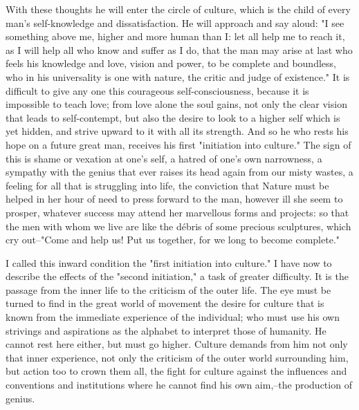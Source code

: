 With these thoughts he will enter the circle of culture, which is the
child of every man's self-knowledge and dissatisfaction. He will
approach and say aloud: "I see something above me, higher and more
human than I: let all help me to reach it, as I will help all who
know and suffer as I do, that the man may arise at last who feels his
knowledge and love, vision and power, to be complete and boundless,
who in his universality is one with nature, the critic and judge of
existence." It is difficult to give any one this courageous
self-consciousness, because it is impossible to teach love; from love
alone the soul gains, not only the clear vision that leads to
self-contempt, but also the desire to look to a higher self which is
yet hidden, and strive upward to it with all its strength. And so he
who rests his hope on a future great man, receives his first
"initiation into culture." The sign of this is shame or vexation at
one's self, a hatred of one's own narrowness, a sympathy with the
genius that ever raises its head again from our misty wastes, a
feeling for all that is struggling into life, the conviction that
Nature must be helped in her hour of need to press forward to the
man, however ill she seem to prosper, whatever success may attend her
marvellous forms and projects: so that the men with whom we live are
like the débris of some precious sculptures, which cry out--"Come and
help us! Put us together, for we long to become complete."

I called this inward condition the "first initiation into culture." I
have now to describe the effects of the "second initiation," a task
of greater difficulty. It is the passage from the inner life to the
criticism of the outer life. The eye must be turned to find in the
great world of movement the desire for culture that is known from the
immediate experience of the individual; who must use his own
strivings and aspirations as the alphabet to interpret those of
humanity. He cannot rest here either, but must go higher. Culture
demands from him not only that inner experience, not only the
criticism of the outer world surrounding him, but action too to crown
them all, the fight for culture against the influences and
conventions and institutions where he cannot find his own aim,--the
production of genius.

